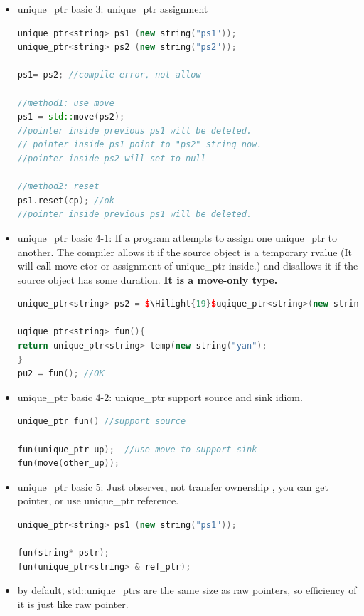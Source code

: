 \documentclass[a4paper,12pt,twoside]{book}
\newcommand{\Hilight}[1]{\makebox[0pt][l]{\color{yellow}\rule[-3pt]{#1em}{11pt}}}
\begin{document}
\begin{itemize}
\item unique\_ptr basic 3: unique\_ptr assignment
\begin{lstlisting}[frame=single, language=c++]
unique_ptr<string> ps1 (new string("ps1"));
unique_ptr<string> ps2 (new string("ps2"));

ps1= ps2; //compile error, not allow

//method1: use move
ps1 = std::move(ps2);
//pointer inside previous ps1 will be deleted.
// pointer inside ps1 point to "ps2" string now.
//pointer inside ps2 will set to null

//method2: reset
ps1.reset(cp); //ok
//pointer inside previous ps1 will be deleted.
\end{lstlisting}

\item unique\_ptr basic 4-1: If a program attempts to assign one unique\_ptr to another. The compiler allows it if the source object is a temporary rvalue (It will call move ctor or assignment of unique\_ptr inside.) and disallows it if the source object has some duration. \textbf{It is a move-only type.}
\begin{lstlisting}[frame=single, language=c++, mathescape=true]
unique_ptr<string> ps2 = $\Hilight{19}$uqique_ptr<string>(new string("yo") ); //OK

uqique_ptr<string> fun(){
return unique_ptr<string> temp(new string("yan");
}
pu2 = fun(); //OK
\end{lstlisting}

\item unique\_ptr basic 4-2: unique\_ptr support source and sink idiom.
\begin{lstlisting}[frame=single, language=c++]
unique_ptr fun() //support source

fun(unique_ptr up);  //use move to support sink
fun(move(other_up));
\end{lstlisting}

\item unique\_ptr basic 5: Just observer, not transfer ownership , you can get pointer, or use unique\_ptr reference.
\begin{lstlisting}[frame=single, language=c++]
unique_ptr<string> ps1 (new string("ps1"));

fun(string* pstr);
fun(unique_ptr<string> & ref_ptr);
\end{lstlisting}

\item by default, std::unique\_ptrs are the same size as raw pointers, so efficiency of it is just like raw pointer.


\end{itemize}
\end{document}
